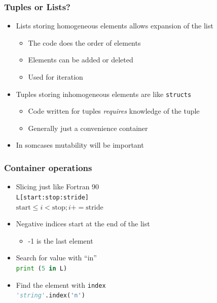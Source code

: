 \documentclass[xcolor=table,10pt,final]{beamer}
\begin{document}
\begin{frame}[fragile]
  \frametitle{Tuples or Lists?}
  \begin{itemize}
    \item Lists storing homogeneous elements allows expansion of the list
      \begin{itemize}
        \item The code does the order of elements
        \item Elements can be added or deleted
        \item Used for iteration
      \end{itemize}
      \vskip1cm
    \item Tuples storing inhomogeneous elements are like {\tt structs}
      \begin{itemize}
        \item Code written for tuples {\it requires} knowledge of the tuple
        \item Generally just a convenience container
      \end{itemize}
      \vskip1cm
    \item In somcases mutability will be important
  \end{itemize}
\end{frame}

\begin{frame}[fragile]
  \frametitle{Container operations}
  \begin{itemize}
    \item Slicing just like Fortran 90\\
      \lstinline[language=python]|L[start:stop:stride]|\\
      $\mathrm{start} \leq i < \mathrm{stop}; i+=\mathrm{stride}$
    \item Negative indices start at the end of the list
      \begin{itemize}
        \item -1 is the last element
      \end{itemize}
    \item Search for value with ``in''\\
      \lstinline[language=python]|print (5 in L)|
    \item Find the element with {\tt index}\\
      \lstinline[language=python]|'string'.index('n')|
  \end{itemize}
\end{frame}
\end{document}
